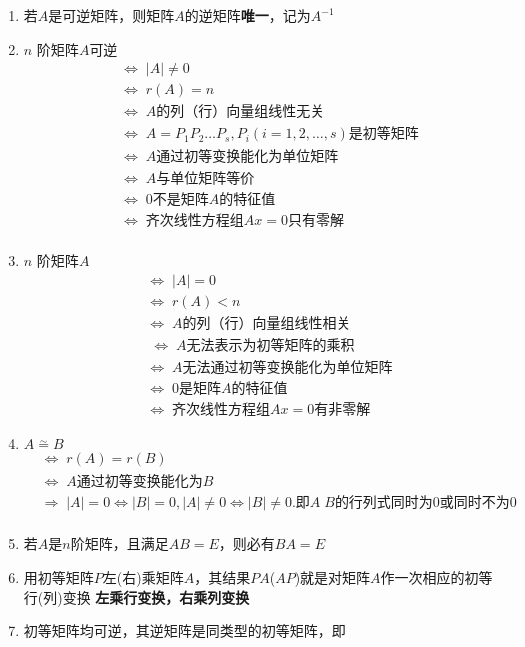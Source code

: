 \documentclass[a4paper,12pt]{article}
\begin{document}
    \begin{enumerate}
        \item 若$A$是可逆矩阵，则矩阵$A$的逆矩阵\textbf{唯一}，记为$A^{-1}$
        \item $n$ 阶矩阵$A$可逆
        \begin{align*}
            &\Leftrightarrow\; |A| \neq 0  \\
            &\Leftrightarrow\; r(A) = n  \\
            &\Leftrightarrow\; A \text{的列（行）向量组线性无关}  \\
            &\Leftrightarrow\; A = P_{1}P_{2}\dots P_{s}, P_{i}(i = 1,2,\dots,s)\text{是初等矩阵}  \\
            &\Leftrightarrow\; A \text{通过初等变换能化为单位矩阵}  \\
            &\Leftrightarrow\; A \text{与单位矩阵等价}  \\
            &\Leftrightarrow\; 0\text{不是矩阵} A \text{的特征值}  \\
            &\Leftrightarrow\; \text{齐次线性方程组} Ax = 0 \text{只有零解}  \\
        \end{align*}
        \item $n$ 阶矩阵$A${\color{red}{不可逆}}
        \begin{align*}
            &\Leftrightarrow\; |A| = 0  \\
            &\Leftrightarrow\; r(A) < n  \\
            &\Leftrightarrow\; A \text{的列（行）向量组线性相关}  \\
            &\;\Leftrightarrow\; A \text{无法表示为初等矩阵的乘积} \\
            &\Leftrightarrow\; A \text{无法通过初等变换能化为单位矩阵}  \\
            &\Leftrightarrow\; 0\text{是矩阵} A \text{的特征值}  \\
            &\Leftrightarrow\; \text{齐次线性方程组} Ax = 0 \text{有非零解}
        \end{align*}
        \item $A \overset{\sim}{=} B$
        \begin{align*}
            &\Leftrightarrow\; r(A) = r(B)  \\
            &\Leftrightarrow\; A \text{通过初等变换能化为} B  \\
            &\Rightarrow\; |A| = 0 \Leftrightarrow |B| = 0, |A| \neq 0 \Leftrightarrow |B| \neq 0. \text{即}A\;B\text{的行列式同时为0或同时不为0}  \\
        \end{align*}
        \item 若$A$是$n$阶矩阵，且满足$AB = E$，则必有$BA = E$
        \item 用初等矩阵$P$左(右)乘矩阵$A$，其结果$PA$($AP$)就是对矩阵$A$作一次相应的初等行(列)变换 \; \Rightarrow \textbf{左乘行变换，右乘列变换}
        \item 初等矩阵均可逆，其逆矩阵是同类型的初等矩阵，即


\end{enumerate}
\end{document}
